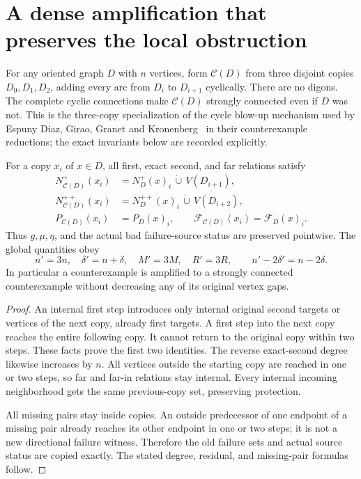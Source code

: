 \section{A dense amplification that preserves the local obstruction}
\label{sec:global-dense-amplification}

For any oriented graph $D$ with $n$ vertices, form $\mathcal C(D)$ from
three disjoint copies $D_0,D_1,D_2$, adding every arc from $D_i$ to
$D_{i+1}$ cyclically. There are no digons. The complete cyclic connections
make $\mathcal C(D)$ strongly connected even if $D$ was not.
This is the three-copy specialization of the cycle blow-up mechanism
used by Espuny Diaz, Girao, Granet and Kronenberg~\cite{EspunyDiazEtAl2025} in their counterexample
reductions; the exact invariants below are recorded explicitly.

\begin{lemma}
\label{lem:global-cyclic-amplification}
For a copy $x_i$ of $x\in D$, all first, exact second, and far relations
satisfy
\[
\begin{split}
 N_{\mathcal C(D)}^+(x_i)&=N_D^+(x)_i\,\dot\cup\,V(D_{i+1}),\\
 N_{\mathcal C(D)}^{++}(x_i)&=N_D^{++}(x)_i\,\dot\cup\,V(D_{i+2}),\\
 P_{\mathcal C(D)}(x_i)&=P_D(x)_i,\qquad
 \mathcal F_{\mathcal C(D)}(x_i)=\mathcal F_D(x)_i.
\end{split}
\]
Thus $g,\mu,\eta$, and the actual bad failure-source status are preserved
pointwise. The global quantities obey
\[
 n'=3n,\quad\delta'=n+\delta,\quad M'=3M,\quad R'=3R,
 \qquad n'-2\delta'=n-2\delta.
\]
In particular a counterexample is amplified to a strongly connected
counterexample without decreasing any of its original vertex gaps.
\end{lemma}
\begin{proof}
An internal first step introduces only internal original second targets
or vertices of the next copy, already first targets. A first step into
the next copy reaches the entire following copy. It cannot return to
the original copy within two steps. These facts prove the first two
identities. The reverse exact-second degree likewise increases by $n$.
All vertices outside the starting copy are reached in one or two steps,
so far and far-in relations stay internal. Every internal incoming
neighborhood gets the same previous-copy set, preserving protection.

All missing pairs stay inside copies. An outside predecessor of one
endpoint of a missing pair already reaches its other endpoint in one
or two steps; it is not a new directional failure witness. Therefore
the old failure sets and actual source status are copied exactly.
The stated degree, residual, and missing-pair formulas follow.
\end{proof}

